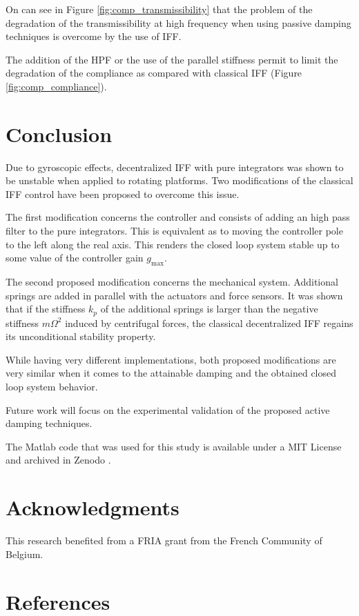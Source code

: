 \documentclass[10pt]{iopart}
\begin{document}
On can see in Figure \ref{fig:comp_transmissibility} that the problem of the degradation of the transmissibility at high frequency when using passive damping techniques is overcome by the use of IFF.

The addition of the HPF or the use of the parallel stiffness permit to limit the degradation of the compliance as compared with classical IFF (Figure \ref{fig:comp_compliance}).

\section{Conclusion}
\label{sec:org0fc9335}
\label{sec:conclusion}

Due to gyroscopic effects, decentralized IFF with pure integrators was shown to be unstable when applied to rotating platforms.
Two modifications of the classical IFF control have been proposed to overcome this issue.

The first modification concerns the controller and consists of adding an high pass filter to the pure integrators.
This is equivalent as to moving the controller pole to the left along the real axis.
This renders the closed loop system stable up to some value of the controller gain \(g_\text{max}\).

The second proposed modification concerns the mechanical system.
Additional springs are added in parallel with the actuators and force sensors.
It was shown that if the stiffness \(k_p\) of the additional springs is larger than the negative stiffness \(m \Omega^2\) induced by centrifugal forces, the classical decentralized IFF regains its unconditional stability property.

While having very different implementations, both proposed modifications are very similar when it comes to the attainable damping and the obtained closed loop system behavior.

Future work will focus on the experimental validation of the proposed active damping techniques.

The Matlab code that was used for this study is available under a MIT License and archived in Zenodo \cite{dehaeze20_activ_dampin_rotat_posit_platf}.

\section*{Acknowledgments}
\label{sec:org45730f8}
This research benefited from a FRIA grant from the French Community of Belgium.

\section*{References}
\label{sec:org676de81}


\end{document}
